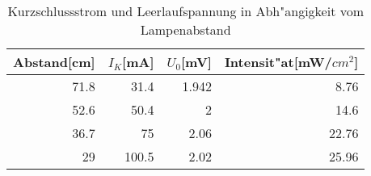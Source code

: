 \begin{table}[h]	
\centering
\begin{tabular}{|r||r||r||r|} \hline
Abstand[cm]	&	$I_K$[mA]	&	$U_0$[mV]	& Intensit"at[mW/$cm^2$]\\ \hline
71.8	&	31.4	&	1.942	&	8.76\\
52.6	&	50.4	&	2	&	14.6\\
36.7	&	75	&	2.06	&	22.76\\
29	&	100.5	& 	2.02	&	25.96
\end{tabular}
\caption{Kurzschlussstrom und Leerlaufspannung in Abh"angigkeit vom Lampenabstand}
\label{tabelle_anfang}
\end{table}